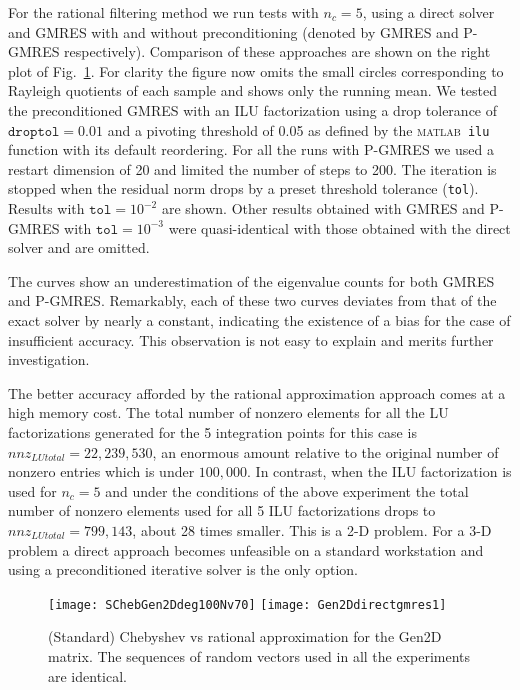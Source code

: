 \documentclass[12pt]{article}		\usepackage{tabls,multirow}
\def \MATLAB {\textsc{matlab}}
\begin{document}
For the rational filtering method we run tests with $n_c = 5$, using a
direct solver and GMRES with and without preconditioning (denoted by
GMRES and P-GMRES respectively). Comparison of these approaches are
shown on the right plot of Fig.~\ref{fig:Gen2D}.  For clarity the
figure now omits the small circles corresponding to Rayleigh quotients
of each sample and shows only the running mean. We tested the
preconditioned GMRES with an ILU factorization using a drop tolerance
of $\texttt{droptol} = 0.01$ and a pivoting threshold of 0.05 as
defined by the \MATLAB\ \texttt{ilu} function with its default
reordering. For all the runs with P-GMRES we used a restart dimension
of 20 and limited the number of steps to 200.  The iteration is
stopped when the residual norm drops by a preset threshold
tolerance (\texttt{tol}).  Results with $\texttt{tol} = 10^{-2}$ are
shown.  Other results obtained with GMRES and P-GMRES with
$\texttt{tol} = 10^{-3}$ were quasi-identical with those obtained with
the direct solver and are omitted.

The curves show an underestimation of the eigenvalue counts for both
GMRES and P-GMRES.  Remarkably, each of these two curves deviates from
that of the exact solver by nearly a constant, indicating the
existence of a bias for the case of insufficient accuracy. This
observation is not easy to explain and merits further investigation.

The better accuracy afforded by the rational approximation approach
comes at a high memory cost.  The total number of nonzero elements for
all the LU factorizations generated for the 5 integration points for
this case is $nnz_{LU total} = 22,239,530$, an enormous amount
relative to the original number of nonzero entries which is under
$100,000$. In contrast, when the ILU factorization is used for $n_c =
5$ and under the conditions of the above experiment the total number
of nonzero elements used for all 5 ILU factorizations drops to
$nnz_{LU total} = 799,143$, about 28 times smaller. This is a 2-D
problem. For a 3-D problem a direct approach becomes unfeasible on a
standard workstation and using a preconditioned iterative solver is
the only option.

\begin{figure}[hbt]
\begin{center}
 \texttt{[image: SChebGen2Ddeg100Nv70]} 
 \texttt{[image: Gen2Ddirectgmres1]}
\end{center} 
 \caption{(Standard) Chebyshev vs rational approximation for 
 the Gen2D matrix. The sequences of 
 random vectors used in all the experiments are identical.
 \label{fig:Gen2D}}
 \end{figure}
\end{document}
